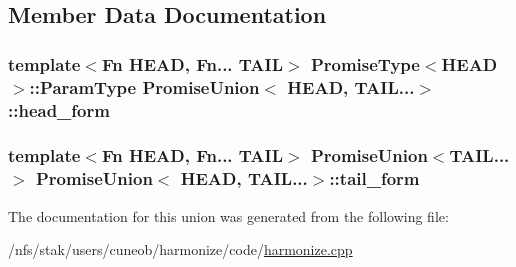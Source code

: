 \subsection{Member Data Documentation}
\hypertarget{unionPromiseUnion_3_01HEAD_00_01TAIL_8_8_8_4_ad16aa739f66e08aae6b96fb088a8bcce}{
\subsubsection[{head\-\_\-form}]{\setlength{\rightskip}{0pt plus 5cm}template$<$Fn H\-E\-A\-D, Fn... T\-A\-I\-L$>$ {\bf Promise\-Type}$<$H\-E\-A\-D$>$\-::Param\-Type {\bf Promise\-Union}$<$ H\-E\-A\-D, T\-A\-I\-L...$>$\-::head\-\_\-form}}\label{unionPromiseUnion_3_01HEAD_00_01TAIL_8_8_8_4_ad16aa739f66e08aae6b96fb088a8bcce}
\hypertarget{unionPromiseUnion_3_01HEAD_00_01TAIL_8_8_8_4_aa60a2e4583b3dd00b35cee4786b2858c}{
\subsubsection[{tail\-\_\-form}]{\setlength{\rightskip}{0pt plus 5cm}template$<$Fn H\-E\-A\-D, Fn... T\-A\-I\-L$>$ {\bf Promise\-Union}$<$T\-A\-I\-L...$>$ {\bf Promise\-Union}$<$ H\-E\-A\-D, T\-A\-I\-L...$>$\-::tail\-\_\-form}}\label{unionPromiseUnion_3_01HEAD_00_01TAIL_8_8_8_4_aa60a2e4583b3dd00b35cee4786b2858c}


The documentation for this union was generated from the following file\-:\begin{DoxyCompactItemize}
\item 
/nfs/stak/users/cuneob/harmonize/code/\hyperlink{harmonize_8cpp}{harmonize.\-cpp}\end{DoxyCompactItemize}
